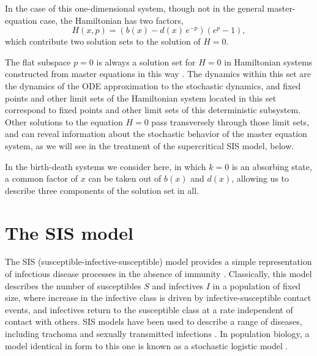 \documentclass[review]{elsarticle}
\begin{document}
In the case of this one-dimensional system, though not in the general
master-equation case, the Hamiltonian has two factors,
\begin{dmath}\label{eqn:BD-H}
 H(x,p) = \left( b(x) - d(x)\,e^{-p} \right) \left(e^p - 1\right),
\end{dmath}
which contribute two solution sets to the solution of $H=0$.

The flat subspace $p=0$ is always a solution set for $H=0$
in Hamiltonian systems constructed from master equations in this way
\cite{hu_stationary_1987}.
The dynamics within this set are the dynamics of the ODE
approximation to the stochastic dynamics, and fixed points
and other limit sets
of the Hamiltonian system located in this set correspond
to fixed points and other limit sets of this deterministic subsystem.
Other solutions to the equation $H=0$ pass transversely through
those limit sets, and can reveal information about the
stochastic behavior of the master equation system, as we will
see in the treatment of the supercritical SIS model, below.

In the birth-death systems we consider here, in which $k=0$ is
an absorbing state, a common factor of $x$ can be taken out of
$b(x)$ and $d(x)$,
allowing us to describe three components
of the solution set in all.

\section{The SIS model}

The SIS (susceptible-infective-susceptible) model
provides a simple representation of
infectious disease processes in the absence of immunity \cite{hethcote1976}.  
Classically, this model describes the number of susceptibles $S$ and infectives $I$
in a population of fixed size, where increase in the infective class
is driven by infective-susceptible contact events, and infectives
return to the susceptible class at a rate independent of contact with others.
SIS models have been used to describe a range of diseases, including
trachoma
\cite{lietman-porco-dawson1999,liu-porco-amza2015b,liu-porco-amza2015,liu-porco-mkocha2014,liu-porco-ray2013}
and sexually transmitted infections \cite{lajmanovich-yorke1976,hethcote-yorke1984}.
In population biology, a model identical in form to this one is known
as a stochastic logistic model \cite{nasell_extinction_2011}.
\end{document}
